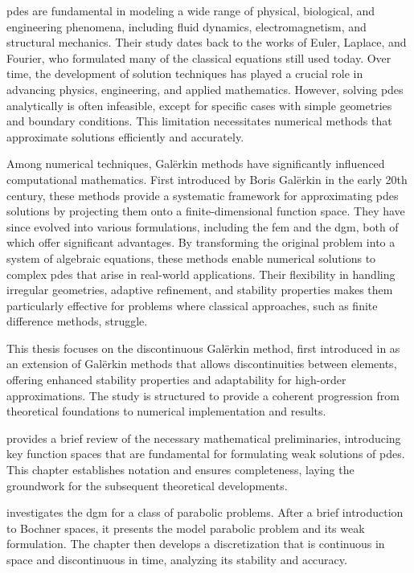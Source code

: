 \acrfull{pdes} are fundamental in modeling a wide range of physical, biological, and engineering phenomena, including fluid dynamics, electromagnetism, and structural mechanics. Their study dates back to the works of Euler, Laplace, and Fourier, who formulated many of the classical equations still used today. Over time, the development of solution techniques has played a crucial role in advancing physics, engineering, and applied mathematics. However, solving \acrshort{pdes} analytically is often infeasible, except for specific cases with simple geometries and boundary conditions. This limitation necessitates numerical methods that approximate solutions efficiently and accurately.

Among numerical techniques, Galërkin methods have significantly influenced computational mathematics. First introduced by Boris Galërkin in the early 20th century, these methods provide a systematic framework for approximating \acrshort{pdes} solutions by projecting them onto a finite-dimensional function space. They have since evolved into various formulations, including the \acrfull{fem} and the \acrfull{dgm}, both of which offer significant advantages. By transforming the original problem into a system of algebraic equations, these methods enable numerical solutions to complex \acrshort{pdes} that arise in real-world applications. Their flexibility in handling irregular geometries, adaptive refinement, and stability properties makes them particularly effective for problems where classical approaches, such as finite difference methods, struggle.

This thesis focuses on the discontinuous Galërkin method, first introduced in  as an extension of Galërkin methods that allows discontinuities between elements, offering enhanced stability properties and adaptability for high-order approximations. The study is structured to provide a coherent progression from theoretical foundations to numerical implementation and results.

 provides a brief review of the necessary mathematical preliminaries, introducing key function spaces that are fundamental for formulating weak solutions of \acrshort{pdes}. This chapter establishes notation and ensures completeness, laying the groundwork for the subsequent theoretical developments.

 investigates the \acrshort{dgm} for a class of parabolic problems. After a brief introduction to Bochner spaces, it presents the model parabolic problem and its weak formulation. The chapter then develops a discretization that is continuous in space and discontinuous in time, analyzing its stability and accuracy.

